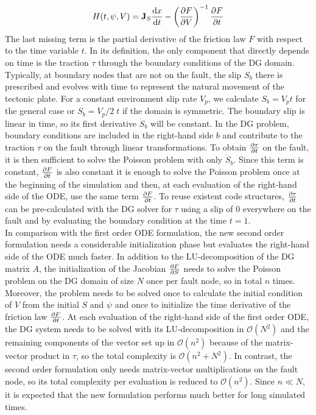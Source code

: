 \begin{equation}
	\label{eq:2nd_order_ODE_formulation_concise}
	H(t,\psi,V) = \mathbf{J}_{S}\dv{x}{t} -\left(\pdv{F}{V}\right)^{-1}\pdv{F}{t}
\end{equation}
The last missing term is the partial derivative of the friction law $F$ with respect to the time variable $t$. In its definition, the only component that directly depends on time is the traction $\tau$ through the boundary conditions of the DG domain. Typically, at boundary nodes that are not on the fault, the slip $S_b$ there is prescribed and evolves with time to represent the natural movement of the tectonic plate. For a constant environment slip rate $V_p$, we calculate $S_b=V_pt$ for the general case or $S_b=V_p/2\;t$ if the domain is symmetric. The boundary slip is linear in time, so its first derivative $\dot{S}_b$ will be constant. In the DG problem, boundary conditions are included in the right-hand side $b$ and contribute to the traction $\tau$ on the fault through linear transformations. To obtain $\pdv{\tau}{t}$ on the fault, it is then sufficient to solve the Poisson problem with only $\dot{S}_b$. Since this term is constant, $\pdv{F}{t}$ is also constant it is enough to solve the Poisson problem once at the beginning of the simulation and then, at each evaluation of the right-hand side of the ODE, use the same term $\pdv{F}{t}$. To reuse existent code structures, $\pdv{\tau}{t}$ can be pre-calculated with the DG solver for $\tau$ using a slip of 0 everywhere on the fault and by evaluating the boundary condition at the time $t=1$. \\
In comparison with the first order ODE formulation, the new second order formulation needs a considerable initialization phase but evaluates the right-hand side of the ODE much faster. In addition to the LU-decomposition of the DG matrix $A$, the initialization of the Jacobian $\pdv{F}{S}$ needs to solve the Poisson problem on the DG domain of size $N$ once per fault node, so in total $n$ times. Moreover, the problem needs to be solved once to calculate the initial condition of $V$ from the initial $S$ and $\psi$ and once to initialize the time derivative of the friction law $\pdv{F}{t}$. At each evaluation of the right-hand side of the first order ODE, the DG system needs to be solved with its LU-decomposition in $\mathcal{O}\left(N^2\right)$ and the remaining components of the vector set up in $\mathcal{O}\left(n^2\right)$ because of the matrix-vector product in $\tau$, so the total complexity is $\mathcal{O}\left(n^2+N^2\right)$. In contrast, the second order formulation only needs matrix-vector multiplications on the fault node, so its total complexity per evaluation is reduced to $\mathcal{O}\left(n^2\right)$. Since $n\ll N$, it is expected that the new formulation performs much better for long simulated times. \\
